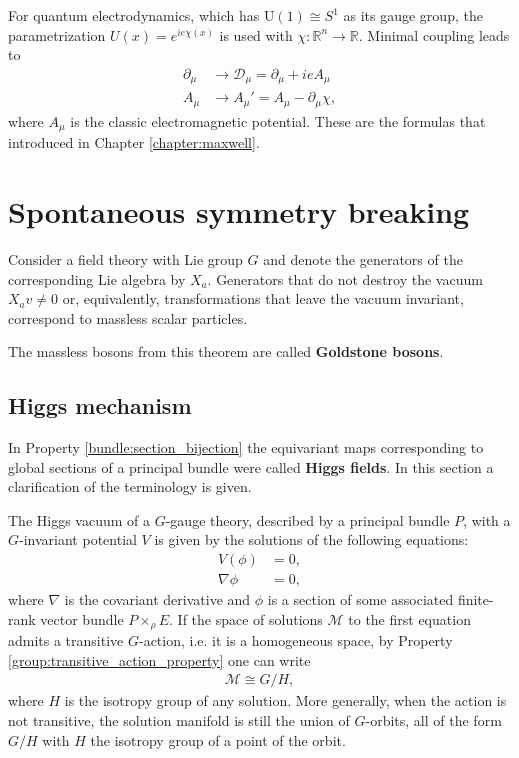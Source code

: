     \begin{example}[QED]
        For quantum electrodynamics, which has $\mathrm{U}(1)\cong S^1$ as its gauge group, the parametrization $U(x) = e^{ie\chi(x)}$ is used with $\chi:\mathbb{R}^n\rightarrow\mathbb{R}$. Minimal coupling leads to
        \begin{align}
            \partial_\mu &\longrightarrow\mathcal{D}_\mu = \partial_\mu + ieA_\mu\\
            A_\mu &\longrightarrow A_\mu' = A_\mu - \partial_\mu\chi,
        \end{align}
        where $A_\mu$ is the classic electromagnetic potential. These are the formulas that introduced in Chapter \ref{chapter:maxwell}.
    \end{example}

\section{Spontaneous symmetry breaking}

    \begin{theorem}[Goldstone]
        Consider a field theory with Lie group $G$ and denote the generators of the corresponding Lie algebra by $X_a$. Generators that do not destroy the vacuum $X_av\neq0$ or, equivalently, transformations that leave the vacuum invariant, correspond to massless scalar particles.
    \end{theorem}
    The massless bosons from this theorem are called \textbf{Goldstone bosons}.

\subsection{Higgs mechanism}

    In Property \ref{bundle:section_bijection} the equivariant maps corresponding to global sections of a principal bundle were called \textbf{Higgs fields}. In this section a clarification of the terminology is given.

    The Higgs vacuum of a $G$-gauge theory, described by a principal bundle $P$, with a $G$-invariant potential $V$ is given by the solutions of the following equations:
    \begin{align}
        V(\phi) &= 0,\\
        \nabla\phi &= 0,
    \end{align}
    where $\nabla$ is the covariant derivative and $\phi$ is a section of some associated finite-rank vector bundle $P\times_\rho E$. If the space of solutions $\mathcal{M}$ to the first equation admits a transitive $G$-action, i.e. it is a homogeneous space, by Property \ref{group:transitive_action_property} one can write
    \begin{gather}
        \mathcal{M}\cong G/H,
    \end{gather}
    where $H$ is the isotropy group of any solution. More generally, when the action is not transitive, the solution manifold is still the union of $G$-orbits, all of the form $G/H$ with $H$ the isotropy group of a point of the orbit.

